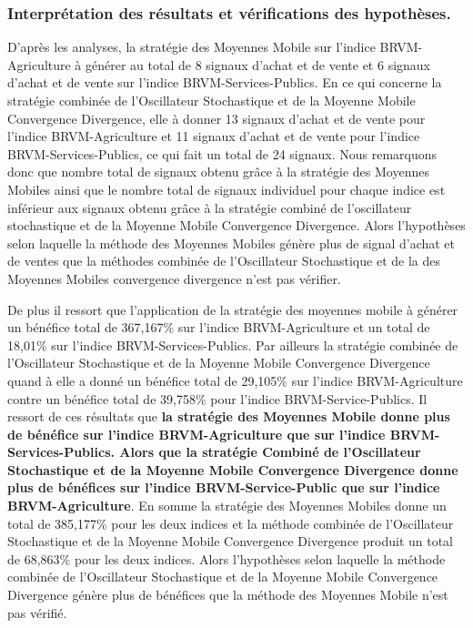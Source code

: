 \begin{itemize}
  \subsubsection{Interprétation des résultats et vérifications des
  hypothèses.}\label{interpruxe9tation-des-ruxe9sultats-et-vuxe9rifications-des-hypothuxe8ses.}

  D'après les analyses, la stratégie des Moyennes Mobile sur l'indice
  BRVM-Agriculture à générer au total de 8 signaux d'achat et de vente
  et 6 signaux d'achat et de vente sur l'indice BRVM-Services-Publics.
  En ce qui concerne la stratégie combinée de l'Oscillateur Stochastique
  et de la Moyenne Mobile Convergence Divergence, elle à donner 13
  signaux d'achat et de vente pour l'indice BRVM-Agriculture et 11
  signaux d'achat et de vente pour l'indice BRVM-Services-Publics, ce
  qui fait un total de 24 signaux. Nous remarquons donc que nombre total
  de signaux obtenu grâce à la stratégie des Moyennes Mobiles ainsi que
  le nombre total de signaux individuel pour chaque indice est inférieur
  aux signaux obtenu grâce à la stratégie combiné de l'oscillateur
  stochastique et de la Moyenne Mobile Convergence Divergence. Alors
  l'hypothèses selon laquelle la méthode des Moyennes Mobiles génère
  plus de signal d'achat et de ventes que la méthodes combinée de
  l'Oscillateur Stochastique et de la des Moyennes Mobiles convergence
  divergence n'est pas vérifier.

  De plus il ressort que l'application de la stratégie des moyennes
  mobile à générer un bénéfice total de 367,167\% sur l'indice
  BRVM-Agriculture et un total de 18,01\% sur l'indice
  BRVM-Services-Publics. Par ailleurs la stratégie combinée de
  l'Oscillateur Stochastique et de la Moyenne Mobile Convergence
  Divergence quand à elle a donné un bénéfice total de 29,105\% sur
  l'indice BRVM-Agriculture contre un bénéfice total de 39,758\% pour
  l'indice BRVM-Service-Publics. Il ressort de ces résultats que
  \textbf{la stratégie des Moyennes Mobile donne plus de bénéfice sur
  l'indice BRVM-Agriculture que sur l'indice BRVM-Services-Publics.
  Alors que la stratégie Combiné de l'Oscillateur Stochastique et de la
  Moyenne Mobile Convergence Divergence donne plus de bénéfices sur
  l'indice BRVM-Service-Public que sur l'indice BRVM-Agriculture}. En
  somme la stratégie des Moyennes Mobiles donne un total de 385,177\%
  pour les deux indices et la méthode combinée de l'Oscillateur
  Stochastique et de la Moyenne Mobile Convergence Divergence produit un
  total de 68,863\% pour les deux indices. Alors l'hypothèses selon
  laquelle la méthode combinée de l'Oscillateur Stochastique et de la
  Moyenne Mobile Convergence Divergence génère plus de bénéfices que la
  méthode des Moyennes Mobile n'est pas vérifié.


\end{itemize}
